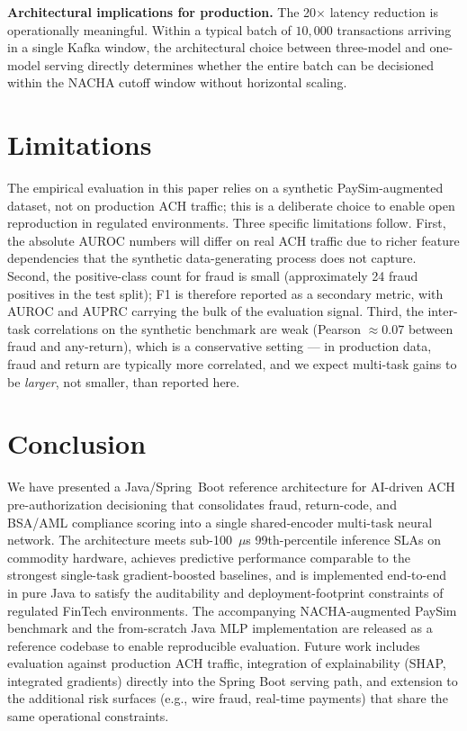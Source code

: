 \documentclass[11pt,a4paper]{article}
\begin{document}
\textbf{Architectural implications for production.} The 20$\times$
latency reduction is operationally meaningful. Within a typical batch of
$10{,}000$ transactions arriving in a single Kafka window, the
architectural choice between three-model and one-model serving directly
determines whether the entire batch can be decisioned within the
NACHA cutoff window without horizontal scaling.

\section{Limitations}
\label{sec:limit}

The empirical evaluation in this paper relies on a synthetic
PaySim-augmented dataset, not on production ACH traffic; this is a
deliberate choice to enable open reproduction in regulated environments.
Three specific limitations follow. First, the absolute AUROC numbers
will differ on real ACH traffic due to richer feature dependencies that
the synthetic data-generating process does not capture. Second, the
positive-class count for fraud is small (approximately 24 fraud
positives in the test split); F1 is therefore reported as a secondary
metric, with AUROC and AUPRC carrying the bulk of the evaluation
signal. Third, the inter-task correlations on the synthetic benchmark
are weak (Pearson $\approx 0.07$ between fraud and any-return),
which is a conservative setting --- in production data, fraud and
return are typically more correlated, and we expect multi-task gains
to be \textit{larger}, not smaller, than reported here.

\section{Conclusion}
\label{sec:concl}

We have presented a Java/Spring~Boot reference architecture for
AI-driven ACH pre-authorization decisioning that consolidates fraud,
return-code, and BSA/AML compliance scoring into a single shared-encoder
multi-task neural network. The architecture meets sub-100~$\mu$s
99th-percentile inference SLAs on commodity hardware, achieves
predictive performance comparable to the strongest single-task
gradient-boosted baselines, and is implemented end-to-end in pure Java
to satisfy the auditability and deployment-footprint constraints of
regulated FinTech environments. The accompanying NACHA-augmented PaySim
benchmark and the from-scratch Java MLP implementation are released as
a reference codebase to enable reproducible evaluation. Future work
includes evaluation against production ACH traffic, integration of
explainability (SHAP, integrated gradients) directly into the Spring
Boot serving path, and extension to the additional risk surfaces
(e.g., wire fraud, real-time payments) that share the same operational
constraints.



\end{document}
